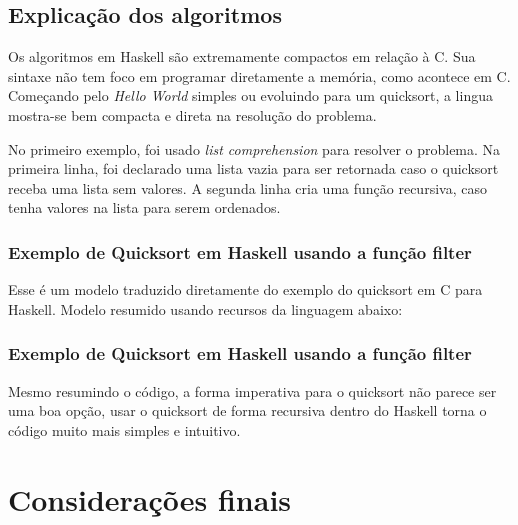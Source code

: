 \documentclass[
  12pt,				         %
  oneside,			       %
  a4paper,			       %
  english,		       	 %
  brazil,			      	 %
]{abntex2}
\begin{document}
      

      \section{Explicação dos algoritmos}
      Os algoritmos em Haskell são extremamente compactos em relação à C. Sua sintaxe não tem foco
      em programar diretamente a memória, como acontece em C. Começando pelo \emph{Hello World} simples ou evoluindo
      para um quicksort, a lingua mostra-se bem compacta e direta na resolução do problema.

      No primeiro exemplo, foi usado \emph{list comprehension} para resolver o problema. Na primeira linha,
      foi declarado uma lista vazia para ser retornada caso o quicksort receba uma lista sem valores. A segunda linha
      cria uma função recursiva, caso tenha valores na lista para serem ordenados.

      \subsection{Exemplo de Quicksort em Haskell usando a função filter}

      

      Esse é um modelo traduzido diretamente do exemplo do quicksort em C para Haskell. Modelo resumido usando recursos da linguagem
      abaixo:

      \subsection{Exemplo de Quicksort em Haskell usando a função filter} 

      

      Mesmo resumindo o código, a forma imperativa para o quicksort não parece ser uma boa opção, usar o quicksort de forma recursiva
      dentro do Haskell torna o código muito mais simples e intuitivo.

      \nocite{beginnersbook}
      \nocite{qastack}
      \nocite{haskellreport98}
      \nocite{progfuncional}

    \newpage


    \chapter*[Considerações finais]{Considerações finais}
\end{document}
